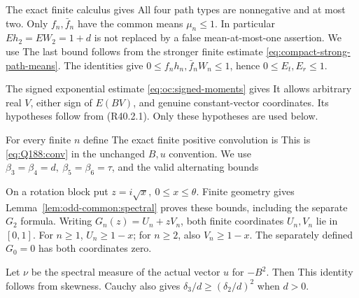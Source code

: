 The exact finite calculus gives
All four path types are nonnegative and at most two. Only \(f_n,\allowbreak  \bar f_n\)
have the common means \(\mu_n\le1\). In particular \(Eh_2=EW_2=1+d\)
is not replaced by a false mean-at-most-one assertion. We use
The last bound follows from the stronger finite estimate
\eqref{eq:compact-strong-path-means}. The identities
give \(0\le f_nh_n,\allowbreak  \bar f_nW_n\le1\), hence \(0\le E_t,\allowbreak  E_r\le1\).

The signed exponential estimate \eqref{eq:oc:signed-moments} gives
It allows arbitrary real \(V\), either sign of \(E(BV)\), and genuine
constant-vector coordinates. Its hypotheses follow from (R40.2.1).
Only these hypotheses are used below.

For every finite \(n\) define
The exact finite positive convolution is
This is \eqref{eq:Q188:conv} in the unchanged \(B,u\) convention.
We use \(\beta_3=\beta_4=d,\allowbreak  \ \beta_5=\beta_6=\tau\), and the valid
alternating bounds


On a rotation block put \(z=i\sqrt x,\allowbreak  \ 0\le x\le\theta\). Finite geometry
gives
Lemma~\ref{lem:odd-common:spectral} proves these bounds, including
the separate \(G_2\) formula.
Writing \(G_n(z)=U_n+zV_n\), both finite coordinates \(U_n,\allowbreak  V_n\)
lie in \([0,\allowbreak  1]\). For \(n\ge1\), \(U_n\ge1-x\); for \(n\ge2\),
also \(V_n\ge1-x\). The separately defined \(G_0=0\) has both
coordinates zero.

Let \(\nu\) be the spectral measure of the actual vector \(u\) for
\(-B^2\). Then
This identity follows from skewness.
Cauchy also gives \(\delta_3/d\ge(\delta_2/d)^2\) when \(d>0\).

